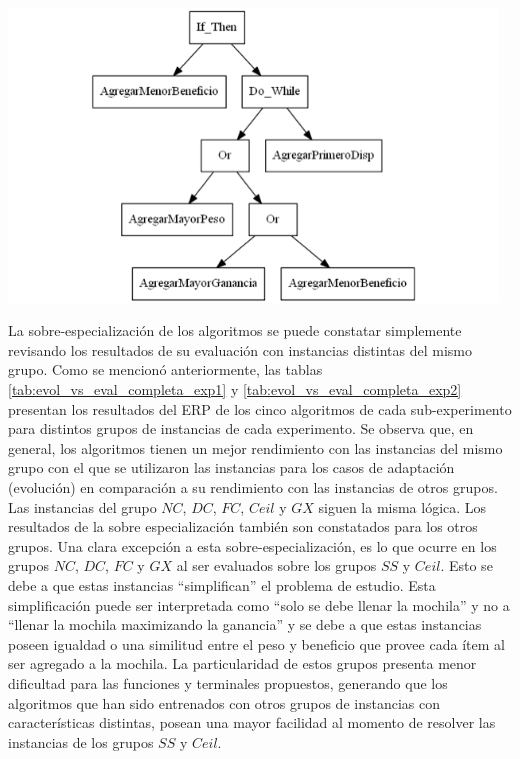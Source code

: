 \begingroup
    \centering
    \includegraphics[width=13cm]{images/cap6/ANKPSS4.png}
    \label{fig:ANKPSS4}
\endgroup

La sobre-especialización de los algoritmos se puede constatar simplemente revisando los resultados de su evaluación con instancias distintas del mismo grupo. Como se mencionó anteriormente, las tablas \ref{tab:evol_vs_eval_completa_exp1} y \ref{tab:evol_vs_eval_completa_exp2} presentan los resultados del ERP de los cinco algoritmos de cada sub-experimento para distintos grupos de instancias de cada experimento. Se observa que, en general, los algoritmos tienen un mejor rendimiento con las instancias del mismo grupo con el que se utilizaron las instancias para los casos de adaptación (evolución) en comparación a su rendimiento con las instancias de otros grupos. Las instancias del grupo $NC$, $DC$, $FC$, $Ceil$ y $GX$ siguen la misma lógica. Los resultados de la sobre especialización también son constatados para los otros grupos. Una clara excepción a esta sobre-especialización, es lo que ocurre en los grupos $NC$, $DC$, $FC$ y $GX$ al ser evaluados sobre los grupos $SS$ y $Ceil$. Esto se debe a que estas instancias “simplifican” el problema de estudio. Esta simplificación puede ser interpretada como “solo se debe llenar la mochila” y no a “llenar la mochila maximizando la ganancia” y se debe a que estas instancias poseen igualdad o una similitud entre el peso y beneficio que provee cada ítem al ser agregado a la mochila. La particularidad de estos grupos presenta menor dificultad para las funciones y terminales propuestos, generando que los algoritmos que han sido entrenados con otros grupos de instancias con características distintas, posean una mayor facilidad al momento de resolver las instancias de los grupos $SS$ y $Ceil$.

